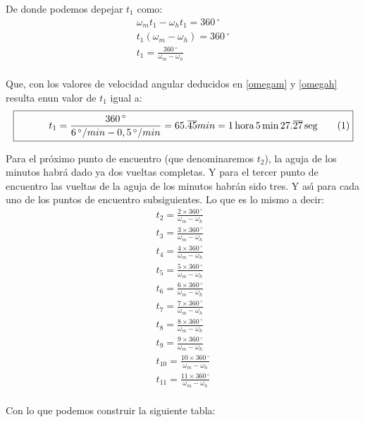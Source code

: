 \documentclass[a4paper,11pt]{article}
\newcommand{\boxedeqn}[1]{%
  \[\fbox{%
      \addtolength{\linewidth}{-2\fboxsep}%
      \addtolength{\linewidth}{-2\fboxrule}%
      \begin{minipage}{\linewidth}%
      \begin{equation}#1\end{equation}%
      \end{minipage}%
    }\]%
}
\begin{document}
\begin{description}
De donde podemos depejar $t_1$ como:
\begin{gather*}
\omega_m t_1 - \omega_h t_1 = 360\,^\circ\\
t_1 (\omega_m - \omega_h) = 360\,^\circ\\
t_1 = \frac {360\,^\circ} {\omega_m - \omega_h} \\
\end{gather*}

Que, con los valores de velocidad angular deducidos en \eqref{omegam} y
\eqref{omegah} resulta enun valor de $t_1$ igual a:
\boxedeqn{%
t_1 = \frac{360\,^\circ}{6\,^\circ/min - 0,5\,^\circ/min} =
65.\overline{45}min =
1\,\text{hora}\,5\,\text{min}\,27.\overline{27}\,\text{seg}
\nonumber
}

Para el pr\'oximo punto de encuentro (que denominaremos $t_2$), la aguja de
los minutos habr\'a dado ya dos vueltas completas. Y para el tercer punto de
encuentro las vueltas de la aguja de los minutos habr\'an sido tres. Y
as\'\i{} para cada uno de los puntos de encuentro subsiguientes. Lo que es lo
mismo a decir:
\begin{align*}
t_2 = \frac {2 \times 360\,^\circ} {\omega_m - \omega_h} \\
t_3 = \frac {3 \times 360\,^\circ} {\omega_m - \omega_h} \\
t_4 = \frac {4 \times 360\,^\circ} {\omega_m - \omega_h} \\
t_5 = \frac {5 \times 360\,^\circ} {\omega_m - \omega_h} \\
t_6 = \frac {6 \times 360\,^\circ} {\omega_m - \omega_h} \\
t_7 = \frac {7 \times 360\,^\circ} {\omega_m - \omega_h} \\
t_8 = \frac {8 \times 360\,^\circ} {\omega_m - \omega_h} \\
t_9 = \frac {9 \times 360\,^\circ} {\omega_m - \omega_h} \\
t_{10} = \frac {10 \times 360\,^\circ} {\omega_m - \omega_h} \\
t_{11} = \frac {11 \times 360\,^\circ} {\omega_m - \omega_h} \\
\end{align*}

Con lo que podemos construir la siguiente tabla:


\end{description}
\end{document}
